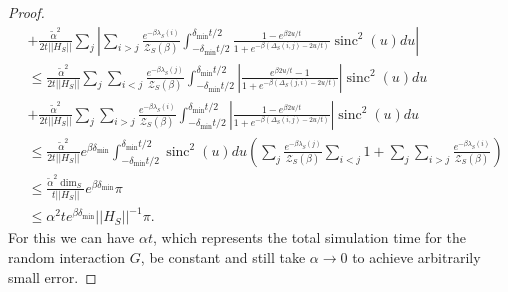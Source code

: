 \documentclass{article}
\newcommand{\abs}[1]{\left| #1 \right|}
\newcommand{\norm}[1]{\left|\left| #1 \right|\right|}
\newcommand{\partfun}{\mathcal{Z}}
\DeclareMathOperator{\sinc}{sinc}
\begin{document}
\begin{proof}
\begin{align}
        &+ \frac{\widetilde{\alpha}^2}{2 t \norm{H_S}} \sum_j  \abs{\sum_{i > j} \frac{e^{-\beta \lambda_S(i)}}{\partfun_S(\beta)} \int_{-\delta_{\min} t /2 }^{\delta_{\min} t/ 2} \frac{1 - e^{\beta 2 u / t}}{1 + e^{-\beta(\Delta_S(i,j) - 2u/t)}} \sinc^2(u) du} \\
        &\le \frac{\widetilde{\alpha}^2}{2 t \norm{H_S}} \sum_j \sum_{i < j} \frac{e^{-\beta \lambda_S(j)}}{\partfun_S(\beta)} \int_{-\delta_{\min} t /2 }^{\delta_{\min} t/ 2}\abs{ \frac{ e^{\beta 2 u / t} - 1}{1 + e^{-\beta(\Delta_S(j, i) - 2u/t)}}} \sinc^2(u) du \nonumber \\
        &+ \frac{\widetilde{\alpha}^2}{2 t \norm{H_S}} \sum_j  \sum_{i > j} \frac{e^{-\beta \lambda_S(i)}}{\partfun_S(\beta)} \int_{-\delta_{\min} t /2 }^{\delta_{\min} t/ 2} \abs{ \frac{1 - e^{\beta 2 u / t}}{1 + e^{-\beta(\Delta_S(i,j) - 2u/t)}} } \sinc^2(u) du \\
        &\le \frac{\widetilde{\alpha}^2}{2 t \norm{H_S}} e^{\beta \delta_{\min}} \int_{-\delta_{\min}t/2}^{\delta_{\min}t /2} \sinc^2(u) du \left(\sum_j \frac{e^{-\beta \lambda_S(j)}}{\partfun_S(\beta)} \sum_{i < j} 1 + \sum_j \sum_{i > j} \frac{e^{-\beta \lambda_S(i)}}{\partfun_S(\beta)}  \right) \\
        &\le \frac{\widetilde{\alpha}^2 \dim_S}{t \norm{H_S}} e^{\beta \delta_{\min}} \pi \\
        &\le \alpha^2 t e^{\beta \delta_{\min}} \norm{H_S}^{-1} \pi.
    \end{align}
    For this we can have $\alpha t$, which represents the total simulation time for the random interaction $G$, be constant and still take $\alpha \to 0$ to achieve arbitrarily small error.


\end{proof}
\end{document}
